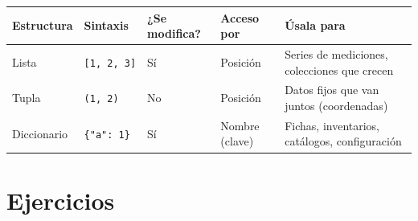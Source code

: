 \documentclass[
  spanish,
  letterpaper,
  DIV=11,
  numbers=noendperiod]{scrreprt}
\newcounter{none} %
\begin{document}
{\def\LTcaptype{none} %
\begin{longtable}[]{@{}
  >{\raggedright\arraybackslash}p{}
  >{\centering\arraybackslash}p{}
  >{\centering\arraybackslash}p{}
  >{\raggedright\arraybackslash}p{}
  >{\raggedright\arraybackslash}p{}@{}}
\toprule\noalign{}
\begin{minipage}[b]{\linewidth}\raggedright
Estructura
\end{minipage} & \begin{minipage}[b]{\linewidth}\centering
Sintaxis
\end{minipage} & \begin{minipage}[b]{\linewidth}\centering
¿Se modifica?
\end{minipage} & \begin{minipage}[b]{\linewidth}\raggedright
Acceso por
\end{minipage} & \begin{minipage}[b]{\linewidth}\raggedright
Úsala para
\end{minipage} \\
\midrule\noalign{}
\endhead
\bottomrule\noalign{}
\endlastfoot
Lista & \texttt{{[}1,\ 2,\ 3{]}} & Sí & Posición & Series de mediciones,
colecciones que crecen \\
Tupla & \texttt{(1,\ 2)} & No & Posición & Datos fijos que van juntos
(coordenadas) \\
Diccionario & \texttt{\{"a":\ 1\}} & Sí & Nombre (clave) & Fichas,
inventarios, catálogos, configuración \\
\end{longtable}
}

\section{Ejercicios}\label{ejercicios-3}
\end{document}
